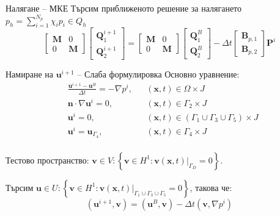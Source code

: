 \documentclass{beamer}
\newcommand{\dotprod}[2]{\left(#1, #2\right)}
\newcommand{\grad}[1]{\nabla#1}
\newcommand{\vecf}[1]{\textbf{#1}}
\begin{document}
\begin{frame}{Налягане -- МКЕ}
	Търсим приближеното решение за налягането $p_h = \sum\limits_{i=1}^{N_p}{\chi_ip_i} \in Q_h$
	$$
	\begin{bmatrix}
		\mathbf{M} & 0 \\
		0 & \mathbf{M}
	\end{bmatrix} \begin{bmatrix}
		\vecf{Q}^{i+1}_1 \\
		\vecf{Q}^{i+1}_2
	\end{bmatrix} =	\begin{bmatrix}
		\mathbf{M} & 0 \\
		0 & \mathbf{M}
	\end{bmatrix} \begin{bmatrix}
		\vecf{Q}^{B}_1 \\
		\vecf{Q}^{B}_2
	\end{bmatrix} - \Delta t \begin{bmatrix}
		\vecf{B}_{p,1} \\
		\vecf{B}_{p,2}
	\end{bmatrix} \vecf{P}^i
	$$
\end{frame}

\begin{frame}{Намиране на $\textbf{u}^{i+1}$ -- Слаба формулировка}
Основно уравнение:
\begin{align*}
		&\frac{\vecf{u}^{i+1} - \vecf{u}^B}{\Delta t} = -\nabla p^i, &&\left(\vecf{x}, t\right) \in \Omega \times J\\
		&\vecf{n} \cdot \grad{\vecf{u}^i} = 0, && \left(\vecf{x}, t\right) \in \Gamma_2 \times J \\
		&\vecf{u}^i = 0, &&\left(\vecf{x}, t\right) \in \left(\Gamma_1 \cup \Gamma_3 \cup \Gamma_5\right) \times J \\
		&\vecf{u}^i = \vecf{u}_{\Gamma_4}, && \left(\vecf{x}, t\right) \in \Gamma_4 \times J \\
\end{align*}

	Тестово пространство: $\vecf{v} \in V : \left\{\vecf{v} \in H^1 : \vecf{v}(\vecf{x}, t)|_{\Gamma_D} = 0 \right\}$.
	
	Търсим $\vecf{u} \in U : \left\{\vecf{v} \in H^1 : \vecf{v}(\vecf{x}, t)|_{\Gamma_1 \cup \Gamma_3 \cup \Gamma_5} = 0\right\}$, такова че:
	$$
	\dotprod{\vecf{u}^{i+1}}{\vecf{v}} = \dotprod{\vecf{u}^B}{\vecf{v}} - \Delta t\dotprod{\vecf{v}} {\grad{p^i}}
	$$

\end{frame}
\end{document}
